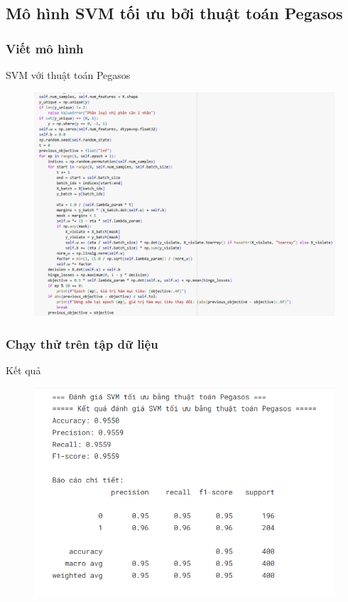 \documentclass[serif, aspectratio=169]{beamer}
\begin{document}
	\subsection{Mô hình SVM tối ưu bởi thuật toán Pegasos}
	\subsubsection{Viết mô hình}
	\begin{frame}{SVM với thuật toán Pegasos}
		\begin{figure}
			\centering
			\includegraphics[width=0.6\linewidth]{pic/svm-pegasus.png}
			\label{fig:svm-pegasus}
		\end{figure}
	\end{frame}
	\subsubsection{Chạy thử trên tập dữ liệu}
	\begin{frame}{Kết quả}
		\begin{figure}
			\centering
			\includegraphics[width=0.7\linewidth]{pic/svm-pegasos-result2000.png}
			\label{fig:svm-pegasos-result2000}
		\end{figure}
	\end{frame}
\end{document}
